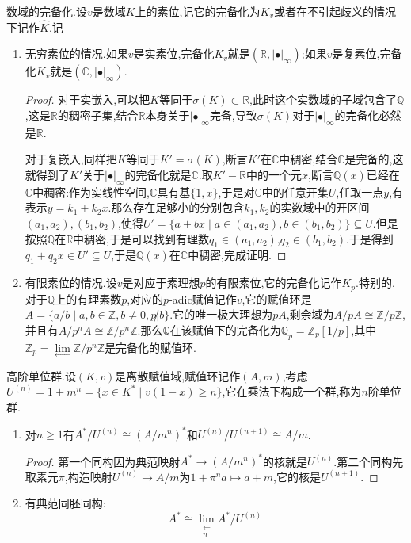 数域的完备化.设$v$是数域$K$上的素位,记它的完备化为$K_v$或者在不引起歧义的情况下记作$\widehat{K}$.记
\begin{enumerate}
	\item 无穷素位的情况.如果$v$是实素位,完备化$K_v$就是$(\mathbb{R},|\bullet|_{\infty})$;如果$v$是复素位,完备化$K_v$就是$(\mathbb{C},|\bullet|_{\infty})$.
	\begin{proof}
		
		对于实嵌入,可以把$K$等同于$\sigma(K)\subset\mathbb{R}$,此时这个实数域的子域包含了$\mathbb{Q}$,这是$\mathbb{R}$的稠密子集,结合$\mathbb{R}$本身关于$|\bullet|_{\infty}$完备,导致$\sigma(K)$对于$|\bullet|_{\infty}$的完备化必然是$\mathbb{R}$.
		
		对于复嵌入,同样把$K$等同于$K'=\sigma(K)$,断言$K'$在$\mathbb{C}$中稠密,结合$\mathbb{C}$是完备的,这就得到了$K'$关于$|\bullet|_{\infty}$的完备化就是$\mathbb{C}$.取$K'-\mathbb{R}$中的一个元$x$,断言$\mathbb{Q}(x)$已经在$\mathbb{C}$中稠密:作为实线性空间,$\mathbb{C}$具有基$\{1,x\}$,于是对$\mathbb{C}$中的任意开集$U$,任取一点$y$,有表示$y=k_1+k_2x$.那么存在足够小的分别包含$k_1,k_2$的实数域中的开区间$(a_1,a_2),(b_1,b_2)$,使得$U'=\{a+bx\mid a\in(a_1,a_2),b\in(b_1,b_2)\}\subseteq U$.但是按照$\mathbb{Q}$在$\mathbb{R}$中稠密,于是可以找到有理数$q_1\in(a_1,a_2)$,$q_2\in(b_1,b_2)$.于是得到$q_1+q_2x\in U'\subseteq U$,于是$\mathbb{Q}(x)$在$\mathbb{C}$中稠密,完成证明.
	\end{proof}
	\item 有限素位的情况.设$v$是对应于素理想$p$的有限素位,它的完备化记作$K_p$.特别的,对于$\mathbb{Q}$上的有理素数$p$,对应的$p$-adic赋值记作$v$,它的赋值环是$A=\{a/b\mid a,b\in\mathbb{Z},b\not=0,p\not| b\}$.它的唯一极大理想为$pA$,剩余域为$A/pA\cong\mathbb{Z}/p\mathbb{Z}$,并且有$A/p^nA\cong\mathbb{Z}/p^n\mathbb{Z}$.那么$\mathbb{Q}$在该赋值下的完备化为$\mathbb{Q}_p=\mathbb{Z}_p[1/p]$,其中$\mathbb{Z}_p=\lim\limits_{\leftarrow}\mathbb{Z}/p^n\mathbb{Z}$是完备化的赋值环.
\end{enumerate}

高阶单位群.设$(K,v)$是离散赋值域,赋值环记作$(A,m)$,考虑$U^{(n)}=1+m^n=\{x\in K^*\mid v(1-x)\ge n\}$,它在乘法下构成一个群,称为$n$阶单位群.
\begin{enumerate}
	\item 对$n\ge1$有$A^*/U^{(n)}\cong(A/m^n)^*$和$U^{(n)}/U^{(n+1)}\cong A/m$.
	\begin{proof}
		
		第一个同构因为典范映射$A^*\to(A/m^n)^*$的核就是$U^{(n)}$.第二个同构先取素元$\pi$,构造映射$U^{(n)}\to A/m$为$1+\pi^na\mapsto a+m$,它的核是$U^{(n+1)}$.
	\end{proof}
    \item 有典范同胚同构:
    $$A^*\cong\lim\limits_{\substack{\leftarrow\\n}}A^*/U^{(n)}$$
\end{enumerate}

